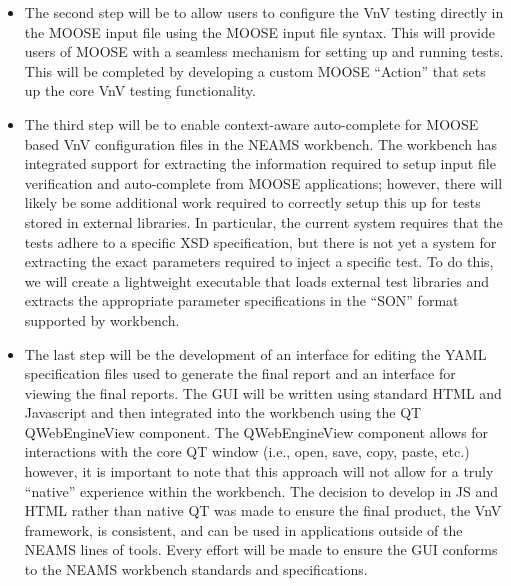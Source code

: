 \begin{itemize}
 \item The second step will be to allow users to configure the VnV testing directly in the MOOSE input file using the MOOSE input
file syntax. This will provide users of MOOSE with a seamless mechanism for setting up and running tests. This will be completed by
developing a custom MOOSE ``Action'' that sets up the core VnV testing functionality. 
\item The third step will be to enable context-aware auto-complete for MOOSE based VnV configuration files in the NEAMS workbench. The workbench
has integrated support for extracting the information required to setup input file verification and auto-complete from MOOSE applications; however, there
will likely be some additional work required to correctly setup this up for tests stored in external libraries. In particular, the current system 
requires that the tests adhere to a specific XSD specification, but there is not yet a system for extracting the exact parameters required to inject a specific test. To do this, we will create a lightweight executable that loads external test libraries and extracts the appropriate parameter specifications in the ``SON'' format supported by workbench.  
\item The last step will be the development of an interface for editing the YAML specification files used to generate the final report and an interface 
for viewing the final reports. The GUI will be written using standard HTML and Javascript and then integrated into the workbench using the QT QWebEngineView component. The QWebEngineView component allows for interactions with the core QT window (i.e., open, save, copy, paste, etc.) however, it is important to note that this approach will not allow for a truly ``native'' experience within the workbench. The decision to develop in JS and HTML rather than native QT was made to ensure the final product, the VnV framework, is consistent, and can be used in applications outside of the NEAMS lines of tools. Every effort will be made to ensure the GUI conforms to the NEAMS workbench standards and specifications. 
\end{itemize}


